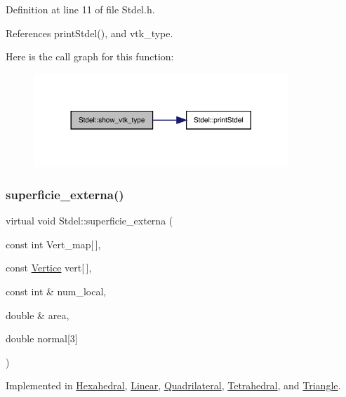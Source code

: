 Definition at line 11 of file Stdel.\+h.



References print\+Stdel(), and vtk\+\_\+type.

Here is the call graph for this function\+:
\nopagebreak
\begin{figure}[H]
\begin{center}
\leavevmode
\includegraphics[width=272pt]{classStdel_a56288a857b95a55c8b7eb5b473e836d9_cgraph}
\end{center}
\end{figure}
\mbox{\label{classStdel_a4e4aa3bbd0299054ec5447bd73efc6a0}} 
\subsubsection{\texorpdfstring{superficie\+\_\+externa()}{superficie\_externa()}}
{\footnotesize\ttfamily virtual void Stdel\+::superficie\+\_\+externa (\begin{DoxyParamCaption}\item[{const int}]{Vert\+\_\+map\mbox{[}$\,$\mbox{]},  }\item[{const \hyperlink{structVertice}{Vertice}}]{vert\mbox{[}$\,$\mbox{]},  }\item[{const int \&}]{num\+\_\+local,  }\item[{double \&}]{area,  }\item[{double}]{normal\mbox{[}3\mbox{]} }\end{DoxyParamCaption})\hspace{0.3cm}{\ttfamily [pure virtual]}}



Implemented in \hyperlink{classHexahedral_a0ba51c2cf3ee2718366e6699fe20aaf4}{Hexahedral}, \hyperlink{classLinear_a33a083b6398f6ee6dfa090a7b10d8de1}{Linear}, \hyperlink{classQuadrilateral_aef8a1501a818c1a7470a62d5cc7fd3d8}{Quadrilateral}, \hyperlink{classTetrahedral_a6ec75f700014db243752113389015fae}{Tetrahedral}, and \hyperlink{classTriangle_a1067d23aa0cc1580d0deed90f4cf3d37}{Triangle}.



